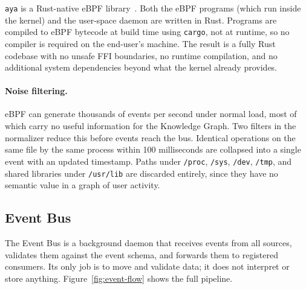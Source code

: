 \texttt{aya} is a Rust-native eBPF library~\cite{aya}. Both the eBPF programs
(which run inside the kernel) and the user-space daemon are written in Rust.
Programs are compiled to eBPF bytecode at build time using \texttt{cargo}, not
at runtime, so no compiler is required on the end-user's machine. The result is
a fully Rust codebase with no unsafe FFI boundaries, no runtime compilation, and
no additional system dependencies beyond what the kernel already provides.

\paragraph{Noise filtering.}
eBPF can generate thousands of events per second under normal load, most of
which carry no useful information for the Knowledge Graph. Two filters in the
normalizer reduce this before events reach the bus. Identical operations on the
same file by the same process within 100 milliseconds are collapsed into a
single event with an updated timestamp. Paths under \texttt{/proc},
\texttt{/sys}, \texttt{/dev}, \texttt{/tmp}, and shared libraries under
\texttt{/usr/lib} are discarded entirely, since they have no semantic value in
a graph of user activity.

\subsection{Event Bus}
\label{sec:event-bus}

The Event Bus is a background daemon that receives events from all sources,
validates them against the event schema, and forwards them to registered
consumers. Its only job is to move and validate data; it does not interpret or
store anything. Figure~\ref{fig:event-flow} shows the full pipeline.

